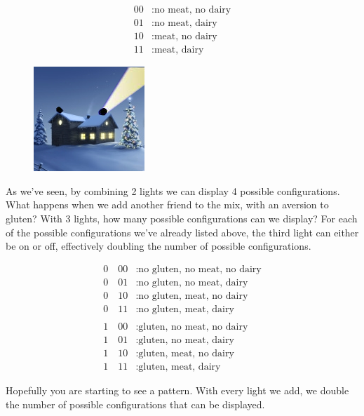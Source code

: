 \documentclass{book}
\begin{document}
\begin{align*}
	00&: \text{no meat, no dairy} \\
	01&: \text{no meat, dairy} \\
	10&: \text{meat, no dairy} \\
	11&: \text{meat, dairy}
\end{align*}

\begin{figure}[H]
\captionsetup{labelformat=empty}
\centering
\includegraphics[width=0.25\linewidth]{house_on_hill_01}
\end{figure}

As we've seen, by combining 2 lights we can display 4 possible configurations. What happens when we add another friend to the mix, with an aversion to gluten? With 3 lights, how many possible configurations can we display? For each of the possible configurations we've already listed above, the third light can either be on or off, effectively doubling the number of possible configurations.

\begin{align*}
	0\quad00&: \text{no gluten, no meat, no dairy} \\
	0\quad 01&: \text{no gluten, no meat, dairy} \\
	0\quad 10&: \text{no gluten, meat, no dairy} \\
	0\quad 11&: \text{no gluten, meat, dairy} \\
          \\
	1\quad 00&: \text{gluten, no meat, no dairy} \\
	1\quad 01&: \text{gluten, no meat, dairy} \\
	1\quad 10&: \text{gluten, meat, no dairy} \\
	1\quad 11&: \text{gluten, meat, dairy}
\end{align*}

Hopefully you are starting to see a pattern. With every light we add, we double the number of possible configurations that can be displayed.
\end{document}
